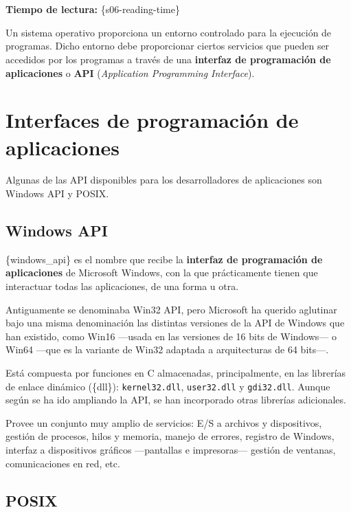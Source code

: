 \section{}

\textbf{Tiempo de lectura:} \{s06-reading-time\}

Un sistema operativo proporciona un entorno controlado para la ejecución
de programas. Dicho entorno debe proporcionar ciertos servicios que
pueden ser accedidos por los programas a través de una \textbf{interfaz
de programación de aplicaciones} o \textbf{{}API} (\emph{Application
Programming Interface}).

\section{Interfaces de programación de
aplicaciones}\label{_interfaces_de_programaciuxf3n_de_aplicaciones}

{} Algunas de las API disponibles para los desarrolladores de
aplicaciones son Windows API y POSIX.

\subsection{\texorpdfstring{{}Windows
API}{Windows API}}\label{_windows_apiwindows_api}

\{windows\_api\} es el nombre que recibe la \textbf{interfaz de
programación de aplicaciones} de Microsoft Windows, con la que
prácticamente tienen que interactuar todas las aplicaciones, de una
forma u otra.

Antiguamente se denominaba Win32 API, pero Microsoft ha querido
aglutinar bajo una misma denominación las distintas versiones de la API
de Windows que han existido, como Win16 ---usada en las versiones de 16
bits de Windows--- o Win64 ---que es la variante de Win32 adaptada a
arquitecturas de 64 bits---.

Está compuesta por funciones en C almacenadas, principalmente, en las
librerías de enlace dinámico (\{dll\}): \texttt{kernel32.dll},
\texttt{user32.dll} y \texttt{gdi32.dll}. Aunque según se ha ido
ampliando la API, se han incorporado otras librerías adicionales.

Provee un conjunto muy amplio de servicios: E/S a archivos y
dispositivos, gestión de procesos, hilos y memoria, manejo de errores,
registro de Windows, interfaz a dispositivos gráficos ---pantallas e
impresoras--- gestión de ventanas, comunicaciones en red, etc.

\subsection{\texorpdfstring{{}POSIX}{POSIX}}\label{_posixposix}

